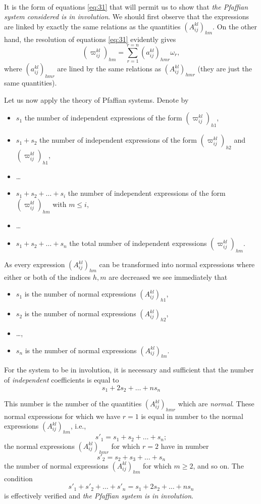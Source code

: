 \documentclass[leqno,12pt]{article}
\theoremstyle{shape1}
\theoremstyle{shape0}
\theoremstyle{shape2}
\theoremstyle{definition}
\begin{document}
\paragraph{}
\label{sec:17}
It is the form of equations \eqref{eq:31} that will permit us to show that \emph{the Pfaffian system considered is in involution}. We should first observe that the expressions are linked by exactly the same relations as the quantities $(A^{kl}_{ij})_{hm}$. On the other hand, the resolution of equations \eqref{eq:31} evidently gives
\[
(\varpi^{kl}_{ij})_{hm}=\sum_{r=1}^{r=n}(a^{kl}_{ij})_{hmr}\omega_{r},
\]
where $(a^{kl}_{ij})_{hmr}$ are lined by the same relations as $(A^{kl}_{ij})_{hmr}$ (they are just the same quantities).

Let us now apply the theory of Pfaffian systems. Denote by
\begin{itemize}
\item $s_{1}$ the number of independent expressions of the form $(\varpi^{kl}_{ij})_{h1}$,
\item $s_{1}+s_{2}$ the number of independent expressions of the form $(\varpi^{kl}_{ij})_{h2}$ and $(\varpi^{kl}_{ij})_{h1}$,
\item \dots
\item $s_{1}+s_{2}+\dots+s_{i}$ the number of independent expressions of the form $(\varpi^{kl}_{ij})_{hm}$ with $m\le i$,
\item \dots
\item $s_{1}+s_{2}+\dots+s_{n}$ the total number of independent expressions $(\varpi^{kl}_{ij})_{hm}$.
\end{itemize}

As every expression $(A^{kl}_{ij})_{hm}$ can be transformed into normal expressions where either or both of the indices $h,m$ are decreased we see immediately that
\begin{itemize}
\item $s_{1}$ is the number of normal expressions $(A^{kl}_{ij})_{h1}$,
\item $s_{2}$ is the number of normal expressions $(A^{kl}_{ij})_{h2}$,
\item \dots,
\item $s_{n}$ is the number of normal expressions $(A^{kl}_{ij})_{hn}$.
\end{itemize}

For the system to be in involution, it is necessary and sufficient that the number of \emph{independent} coefficients is equal to
\[
s_{1}+2s_{2}+\dots+ns_{n}
\]

This number is the number of the quantities $(A^{kl}_{ij})_{hmr}$ which are \emph{normal}. These normal expressions for which we have $r=1$ is equal in number to the normal expressions $(A^{kl}_{ij})_{hm}$, i.e.,
\[
s'_{1}=s_{1}+s_{2}+\dots+s_{n};
\]
the normal expressions $(A^{kl}_{ij})_{hmr}$ for which $r=2$ have in number
\[
s'_{2}=s_{2}+s_{3}+\dots+s_{n}
\]
the number of normal expressions $(A^{kl}_{ij})_{hm}$ for which $m\ge 2$, and so on. The condition
\[
s'_{1}+s'_{2}+\dots+s'_{n}=s_{1}+2s_{2}+\dots+ns_{n}
\]
is effectively verified and \emph{the Pfaffian system is in involution}.
\end{document}
